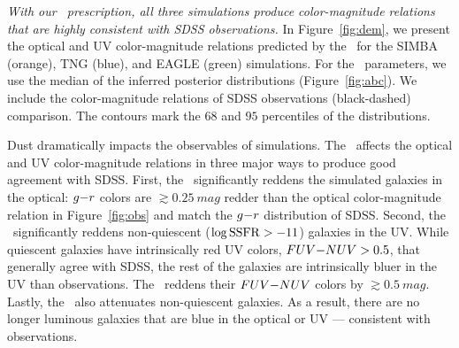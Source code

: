 \emph{With our \eda~prescription, all three simulations produce
color-magnitude relations that are highly consistent with SDSS observations.}
In Figure~\ref{fig:dem}, we present the optical and UV color-magnitude
relations predicted by the 
\eda~for the SIMBA (orange), TNG (blue), and EAGLE (green) simulations. 
For the \eda~parameters, we use the median of the inferred posterior distributions (Figure~\ref{fig:abc}). 
We include the color-magnitude
relations of SDSS observations (black-dashed) comparison. The contours mark 
the $68$ and $95$ percentiles of the distributions. 

Dust dramatically impacts the observables of simulations. 
The \eda~affects the optical and UV color-magnitude relations in three
major ways to produce good agreement with SDSS. 
First, the \eda~significantly reddens the simulated galaxies in the optical: 
$g{-}r$ colors are ${\gtrsim}0.25~mag$ redder than the optical
color-magnitude relation in Figure~\ref{fig:obs} and match the $g{-}r$
distribution of SDSS. 
Second, the \eda~significantly reddens non-quiescent ($\log{\rm SSFR} > -11$)
galaxies in the UV.  
While quiescent galaxies have intrinsically red UV colors, $FUV{-}NUV > 0.5$,
that generally agree with SDSS, the rest of the galaxies are intrinsically
bluer in the UV than observations. 
The \eda~reddens their $FUV{-}NUV$ colors by ${\gtrsim}0.5~mag$.
Lastly, the \eda~also attenuates non-quiescent galaxies.
As a result, there are no longer luminous galaxies that are blue in the
optical or UV --- consistent with observations.

